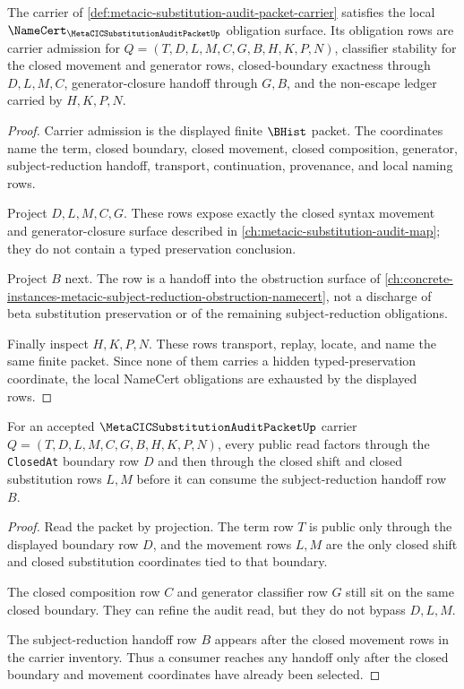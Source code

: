 \begin{theorem}
\label{thm:metacic-substitution-audit-packet-namecert-obligations}
The carrier of \autoref{def:metacic-substitution-audit-packet-carrier} satisfies the local $\NameCert_{\MetaCICSubstitutionAuditPacketUp}$ obligation surface. Its obligation rows are carrier admission for $Q=(T,D,L,M,C,G,B,H,K,P,N)$, classifier stability for the closed movement and generator rows, closed-boundary exactness through $D,L,M,C$, generator-closure handoff through $G,B$, and the non-escape ledger carried by $H,K,P,N$.
\end{theorem}
\begin{proof}
Carrier admission is the displayed finite $\BHist$ packet. The coordinates name the term, closed boundary, closed movement, closed composition, generator, subject-reduction handoff, transport, continuation, provenance, and local naming rows.

Project $D,L,M,C,G$. These rows expose exactly the closed syntax movement and generator-closure surface described in \autoref{ch:metacic-substitution-audit-map}; they do not contain a typed preservation conclusion.

Project $B$ next. The row is a handoff into the obstruction surface of \autoref{ch:concrete-instances-metacic-subject-reduction-obstruction-namecert}, not a discharge of beta substitution preservation or of the remaining subject-reduction obligations.

Finally inspect $H,K,P,N$. These rows transport, replay, locate, and name the same finite packet. Since none of them carries a hidden typed-preservation coordinate, the local NameCert obligations are exhausted by the displayed rows.
\end{proof}

\begin{theorem}
\label{thm:metacic-substitution-audit-packet-boundary}
For an accepted $\MetaCICSubstitutionAuditPacketUp$ carrier $Q=(T,D,L,M,C,G,B,H,K,P,N)$, every public read factors through the \texttt{ClosedAt} boundary row $D$ and then through the closed shift and closed substitution rows $L,M$ before it can consume the subject-reduction handoff row $B$.
\end{theorem}
\begin{proof}
Read the packet by projection. The term row $T$ is public only through the displayed boundary row $D$, and the movement rows $L,M$ are the only closed shift and closed substitution coordinates tied to that boundary.

The closed composition row $C$ and generator classifier row $G$ still sit on the same closed boundary. They can refine the audit read, but they do not bypass $D,L,M$.

The subject-reduction handoff row $B$ appears after the closed movement rows in the carrier inventory. Thus a consumer reaches any handoff only after the closed boundary and movement coordinates have already been selected.
\end{proof}

